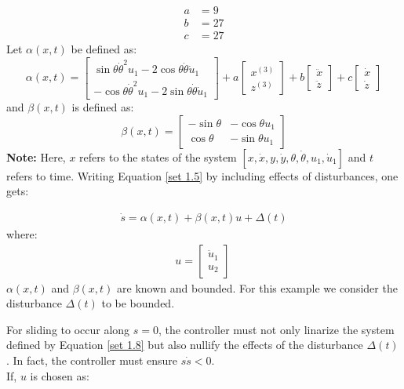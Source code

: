 \documentclass{article}
\begin{document}
\begin{equation}\label{set 1.7}
  \begin{split}
  a&=9 \\
  b&=27\\
  c&=27
  \end{split}
\end{equation}
Let $\alpha(x,t)$ be defined as:
\[ \alpha(x,t)= \left[\begin{array}{c}
\sin \theta \dot{\theta}^2u_1-2\cos \theta \dot{\theta}\dot{u}_1
\\-\cos \theta \dot{\theta}^2u_1-2\sin \theta \dot{\theta}\dot{u}_1
\end{array}\right] +a\left[\begin{array}{cc}x^{(3)}\\z^{(3)}\end{array}\right] + b\left[\begin{array}{cc}\ddot{x}\\\ddot{z}\end{array}\right] + c\left[\begin{array}{cc}\dot{x}\\\dot{z}\end{array}\right]\]
and $\beta(x,t)$ is defined as:
\[ \beta(x,t)= \left[\begin{array}{cc}-\sin\theta & -\cos \theta u_1\\
\cos \theta &-\sin \theta u_1 \end{array}\right] \]
\textbf{Note:} Here, $x$ refers to the states of the system $[x,\dot{x},y,\dot{y},\theta ,\dot{\theta},u_1,\dot{u}_1 ]$ and $t$ refers to time.
Writing Equation \ref{set 1.5} by including effects of disturbances, one gets:

\begin{align}
\dot{s}=\alpha(x,t)+\beta(x,t)u+\Delta(t)
\label{set 1.8}
\end{align}
where:
\begin{align*}
u=\left[\begin{array}{c}\ddot{u}_1\\u_2\end{array}\right] 
\ 
\end{align*}
$\alpha(x,t)$ and $\beta(x,t)$ are known and bounded. For this example we consider the disturbance $\Delta(t)$ to be bounded.

For sliding to occur along $s=0$, the controller must not only linarize the system defined by Equation \ref{set 1.8} but also nullify the effects of the disturbance $\Delta(t)$. In fact, the controller must ensure $s\dot{s}<0$.\\
If, $u$ is chosen as:
\end{document}
